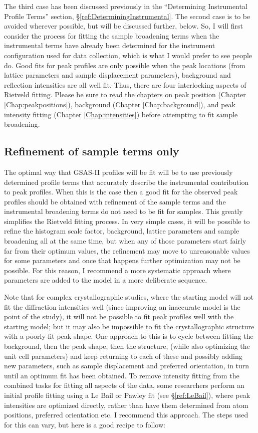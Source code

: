 The third case has been discussed previously in the “Determining Instrumental Profile Terms” section, \S\ref{ref:DeterminingInstrumental}. The second case is to be avoided wherever possible, but will be discussed further, below. So, I will first consider the process for fitting the sample broadening terms when the instrumental terms have already been determined for the instrument configuration used for data collection, which is what I would prefer to see people do. Good fits for peak profiles are only possible when the peak locations (from lattice parameters and sample displacement parameters), background and reflection intensities are all well fit. Thus, there are four interlocking aspects of Rietveld fitting. Please be sure to read the chapters on peak position (Chapter \ref{Chap:peakpositions}), background (Chapter \ref{Chap:background}), and peak intensity fitting (Chapter \ref{Chap:intensities}) before attempting to fit sample broadening.

\subsection{Refinement of sample terms only}

The optimal way that GSAS-II profiles will be fit will be to use previously determined profile terms that accurately describe the instrumental contribution to peak profiles. When this is the case then a good fit for the observed peak profiles should be obtained with refinement of the sample terms and the instrumental broadening terms do not need to be fit for samples. This greatly simplifies the Rietveld fitting process. In very simple cases, it will be possible to refine the histogram scale factor, background, lattice parameters and sample broadening all at the same time, but when any of those parameters start fairly far from their optimum values, the refinement may move to unreasonable values for some parameters and once that happens further optimization may not be possible. For this reason, I recommend a more systematic approach where parameters are added to the model in a more deliberate sequence. 

 Note that for complex crystallographic studies, where the starting model will not fit the diffraction intensities well (since improving an inaccurate model is the point of the study), it will not be possible to fit peak profiles well with the starting model; but it may also be impossible to fit the crystallographic structure with a poorly-fit peak shape. One approach to this is to cycle between fitting the background, then the peak shape, then the structure, (while also optimizing the unit cell parameters) and keep returning to each of these and possibly adding new parameters, such as sample displacement and preferred orientation, in turn until an optimum fit has been obtained. To remove intensity fitting from the combined tasks for fitting all aspects of the data, some researchers perform an initial profile fitting using a Le Bail or Pawley fit (see \S\ref{ref:LeBail}), where peak intensities are optimized directly, rather than have them determined from atom positions, preferred orientation etc. I recommend this approach. The steps used for this can vary, but here is a good recipe to follow: 

